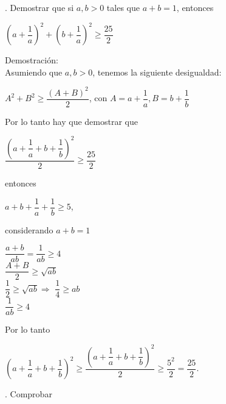 \documentclass[12pt,a4paper,scrartcl]{article}
\begin{document}
{. Demostrar que si $a,b>0$ tales que $a+b=1$, entonces\\ 
\begin{center}
$(a+\dfrac{1}{a})^2+(b+\dfrac{1}{a})^2\geq \dfrac{25}{2}$\\\vspace{1em}
\end{center}
Demostraci\'on:\\
Asumiendo que $a,b > 0$, tenemos la siguiente desigualdad:\\
\begin{center}
$A^2+B^2\geq\dfrac{(A+B)^2}{2}$, con $A=a+\dfrac{1}{a},B=b+\dfrac{1}{b}$\\\vspace{1em}
\end{center}
Por lo tanto hay que demostrar que\\\vspace{1em}
\begin{center}
$\dfrac{(a+\dfrac{1}{a}+b+\dfrac{1}{b})^2}{2}\geq \dfrac{25}{2}$\\\vspace{1em}
\end{center}
entonces\\\vspace{1em}
\begin{center}
$a+b+\dfrac{1}{a}+\dfrac{1}{b} \geq 5$, \\
\end{center}
considerando $a+b=1$\\
\begin{center}

$\dfrac{a+b}{ab}=\dfrac{1}{ab}\geq4$\\\vspace{1em}
$\dfrac{A+B}{2}\geq \sqrt{ab}$\\\vspace{1em}
$\dfrac{1}{2}\geq \sqrt{ab} \Rightarrow$ 
$\dfrac{1}{4}\geq ab $\\
$\dfrac{1}{ab}\geq 4 $\\
\end{center}
Por lo tanto 
\begin{center}
$(a+\dfrac{1}{a}+b+\dfrac{1}{b})^2\geq \dfrac{(a+\dfrac{1}{a}+b+\dfrac{1}{b})^2}{2}\geq \dfrac{5^2}{2}=\dfrac{25}{2}$.
\end{center}



. Comprobar\\


}
\end{document}
